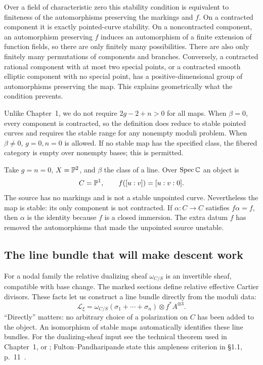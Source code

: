 Over a field of characteristic zero this stability condition is equivalent to finiteness of the automorphisms preserving the markings and $f$. On a contracted component it is exactly pointed-curve stability. On a noncontracted component, an automorphism preserving $f$ induces an automorphism of a finite extension of function fields, so there are only finitely many possibilities. There are also only finitely many permutations of components and branches. Conversely, a contracted rational component with at most two special points, or a contracted smooth elliptic component with no special point, has a positive-dimensional group of automorphisms preserving the map. This explains geometrically what the condition prevents.

Unlike Chapter~1, we do not require $2g-2+n>0$ for all maps. When $\beta=0$, every component is contracted, so the definition does reduce to stable pointed curves and requires the stable range for any nonempty moduli problem. When $\beta\neq0$, $g=0,n=0$ is allowed. If no stable map has the specified class, the fibered category is empty over nonempty bases; this is permitted.

\begin{Ex}\label{maps:first-line}
Take $g=n=0$, $X=\mathbb P^2$, and $\beta$ the class of a line. Over $\operatorname{Spec}\mathbb C$ an object is
\[
 C=\mathbb P^1,\qquad f([u:v])=[u:v:0].
\]
The source has no markings and is not a stable unpointed curve. Nevertheless the map is stable: its only component is not contracted. If $\alpha:C\to C$ satisfies $f\alpha=f$, then $\alpha$ is the identity because $f$ is a closed immersion. The extra datum $f$ has removed the automorphisms that made the unpointed source unstable.
\end{Ex}

\subsection{The line bundle that will make descent work}

For a nodal family the relative dualizing sheaf $\omega_{C/S}$ is an invertible sheaf, compatible with base change. The marked sections define relative effective Cartier divisors. These facts let us construct a line bundle directly from the moduli data:
\begin{equation}\label{maps:polarization}
 \mathcal L_\xi=\omega_{C/S}(\sigma_1+\cdots+\sigma_n)\otimes f^*A^{\otimes3}.
\end{equation}
``Directly'' matters: no arbitrary choice of a polarization on $C$ has been added to the object. An isomorphism of stable maps automatically identifies these line bundles. For the dualizing-sheaf input see the technical theorem used in Chapter~1, or ; Fulton--Pandharipande state this ampleness criterion in \S1.1, p.~11~\cite{FP}.

